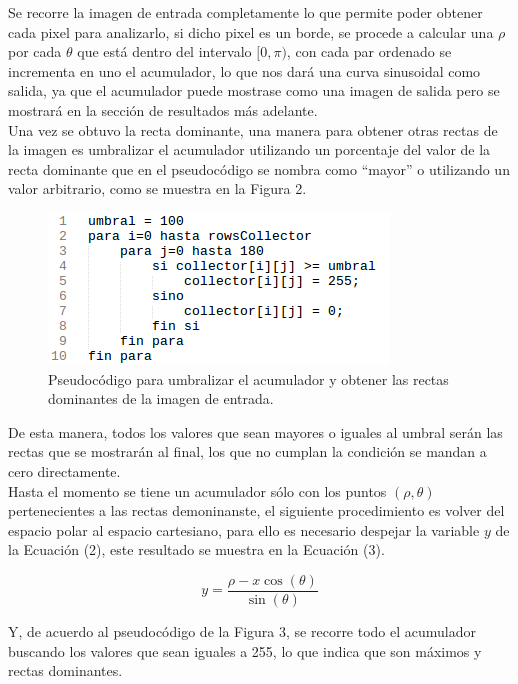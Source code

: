 \documentclass[conference]{IEEEtran}
\begin{document}
Se recorre la imagen de entrada completamente lo que permite poder obtener cada pixel para analizarlo, si dicho pixel es un borde, se procede a calcular una $\rho$ por cada $\theta$ que est\'a dentro del intervalo $[0,\pi)$, con cada par ordenado se incrementa en uno el acumulador, lo que nos dar\'a una curva sinusoidal como salida, ya que el acumulador puede mostrase como una imagen de salida pero se mostrar\'a en la secci\'on de resultados m\'as adelante.\\

Una vez se obtuvo la recta dominante, una manera para obtener otras rectas de la imagen es umbralizar el acumulador utilizando un porcentaje del valor de la recta dominante que en el pseudoc\'odigo se nombra como ``mayor'' o utilizando un valor arbitrario, como se muestra en la Figura 2.

\begin{figure}[h]
	\setlength{\unitlength}{0.105in}
	\includegraphics[scale=0.50]{./images/pseudo2.png}
	\caption{ Pseudoc\'odigo para umbralizar el acumulador y obtener las rectas dominantes de la imagen de entrada. }
\end{figure}

De esta manera, todos los valores que sean mayores o iguales al umbral ser\'an las rectas que se mostrar\'an al final, los que no cumplan la condici\'on se mandan a cero directamente.\\

Hasta el momento se tiene un acumulador s\'olo con los puntos $(\rho,\theta)$ pertenecientes a las rectas demoninanste, el siguiente procedimiento es volver del espacio polar al espacio cartesiano, para ello es necesario despejar la variable $y$ de la Ecuaci\'on (2), este resultado se muestra en la Ecuaci\'on (3).

\begin{equation}
	y = \frac{\rho - x\cos(\theta)}{\sin(\theta)}
\end{equation}

Y, de acuerdo al pseudoc\'odigo de la Figura 3, se recorre todo el acumulador buscando los valores que sean iguales a 255, lo que indica que son m\'aximos y rectas dominantes.
\end{document}
